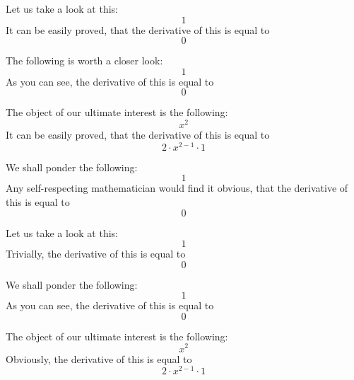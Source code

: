 \documentclass{article}
\begin{document}
Let us take a look at this:
\begin{equation}
1 
\end{equation}
It can be easily proved, that the derivative of this is equal to
\begin{equation}
0 
\end{equation}

The following is worth a closer look:
\begin{equation}
1 
\end{equation}
As you can see, the derivative of this is equal to
\begin{equation}
0 
\end{equation}

The object of our ultimate interest is the following:
\begin{equation}
x ^{2 } 
\end{equation}
It can be easily proved, that the derivative of this is equal to
\begin{equation}
2 \cdot x ^{2 - 1 } \cdot 1 
\end{equation}

We shall ponder the following:
\begin{equation}
1 
\end{equation}
Any self-respecting mathematician would find it obvious, that the derivative of this is equal to
\begin{equation}
0 
\end{equation}

Let us take a look at this:
\begin{equation}
1 
\end{equation}
Trivially, the derivative of this is equal to
\begin{equation}
0 
\end{equation}

We shall ponder the following:
\begin{equation}
1 
\end{equation}
As you can see, the derivative of this is equal to
\begin{equation}
0 
\end{equation}

The object of our ultimate interest is the following:
\begin{equation}
x ^{2 } 
\end{equation}
Obviously, the derivative of this is equal to
\begin{equation}
2 \cdot x ^{2 - 1 } \cdot 1 
\end{equation}
\end{document}
